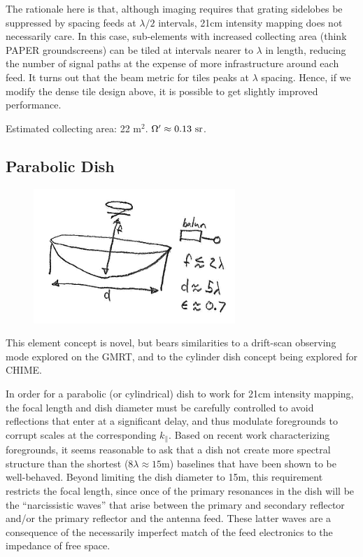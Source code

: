 \documentclass[11pt]{article}
\begin{document}
The rationale here is that, although imaging requires that grating sidelobes be suppressed by
spacing feeds at $\lambda/2$ intervals, 21cm intensity mapping does not necessarily care.  In this
case, sub-elements with increased collecting area (think PAPER groundscreens) can be tiled at
intervals nearer to $\lambda$ in length, reducing the number of signal paths at the expense of
more infrastructure around each feed.  It turns out that the beam metric for tiles peaks
at $\lambda$ spacing.  Hence, if we modify the dense tile design above, it is possible to
get slightly improved performance.

Estimated collecting area: 22 m$^2$.
$\Omega^\prime\approx0.13\ {\rm sr}$.

\subsection{Parabolic Dish}

\begin{figure}
\centering
\includegraphics[width=3in]{plots/eor_dish.png}
\caption{}
\label{fig:element_dish}
\end{figure}

This element concept is novel, but bears similarities to a drift-scan observing mode explored on
the GMRT, and to the cylinder dish concept being explored for CHIME.  

In order for a parabolic (or cylindrical) dish to work for 21cm intensity mapping, the focal length
and dish diameter must be carefully controlled to avoid reflections that enter at a significant delay,
and thus modulate foregrounds to corrupt scales at the corresponding $k_\parallel$.  Based on recent work
characterizing foregrounds, it seems reasonable to ask that a dish not create more spectral structure than
the shortest ($8\lambda\approx15$m) baselines that have been shown to be well-behaved.  Beyond limiting
the dish diameter to 15m, this requirement restricts the focal length, since once of the primary resonances
in the dish will be the ``narcissistic waves'' that arise between the primary and secondary reflector and/or
the primary reflector and the antenna feed.  These latter waves are a consequence of the necessarily
imperfect match of the feed electronics to the impedance of free space.
\end{document}
